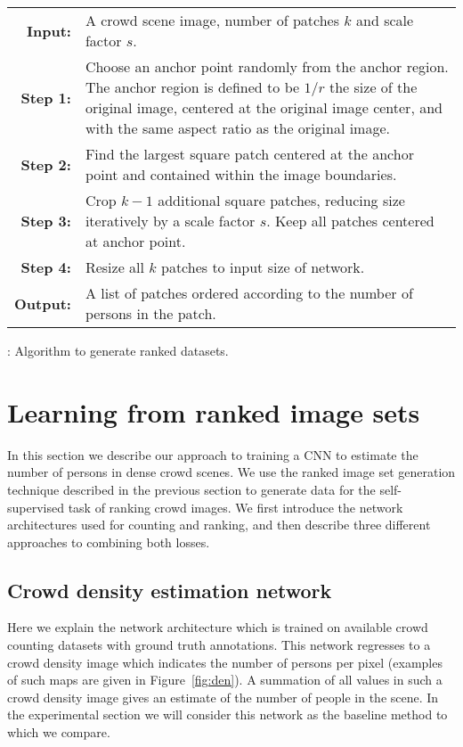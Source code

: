 \documentclass[10pt,twocolumn,letterpaper]{article}
\begin{document}
\begin{algorithm}[tb]
\centering
\begin{tabularx}{\columnwidth}{rp{}}
\hline
\textbf{Input:}  & A crowd scene image, number of patches $k$ and scale factor $s$. \\
\textbf{Step 1:} & Choose an anchor point randomly from the anchor
region. The anchor region is defined to be $1/r$ the size of the original image, centered at the original image center, and with the same aspect ratio as the original image. \\
\textbf{Step 2:} & Find the largest square patch centered at the
anchor point and contained within the image boundaries. \\
\textbf{Step 3:} & Crop $k-1$ additional square patches, reducing size
iteratively by a scale factor $s$. Keep all patches centered at
anchor point. \\
\textbf{Step 4:} & Resize all $k$ patches to input size of network.\\
\textbf{Output:} & A list of patches ordered according to the number of persons in the patch.\\  \hline
\end{tabularx}
\caption{: Algorithm to generate ranked datasets.}
\label{table:algorithm2}
\end{algorithm}


\section{Learning from ranked image sets} \label{sec:method}
In this section we describe our approach to training a CNN to estimate the number of persons in dense crowd scenes. We use the ranked image set generation technique described in the previous section to generate data for the self-supervised task of ranking crowd images. We first introduce the network architectures used for counting and ranking, and then describe three different approaches to combining both losses.


\subsection{Crowd density estimation network}
Here we explain the network architecture which is trained on available crowd counting datasets with ground truth annotations. This network regresses to a crowd density image which indicates the number of persons per pixel (examples of such maps are given in Figure~\ref{fig:den}). A summation of all values in such a crowd density image gives an estimate of the number of people in the scene. In the experimental section we will consider this network as the baseline method to which we compare.
\end{document}
